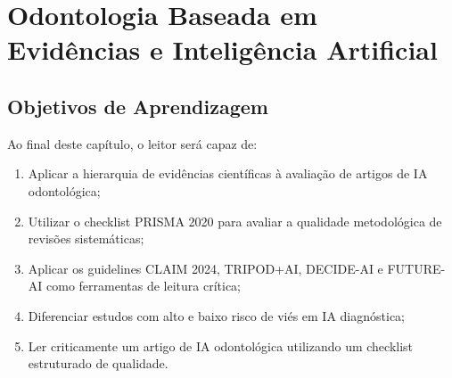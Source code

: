 
\chapter{Odontologia Baseada em Evidências e Inteligência Artificial}
\label{cap:evidencia-revisoes}

\nivelbasico

\section{Objetivos de Aprendizagem}

Ao final deste capítulo, o leitor será capaz de:
\begin{enumerate}
    \item Aplicar a hierarquia de evidências científicas à avaliação de artigos de IA odontológica;
    \item Utilizar o checklist PRISMA 2020 para avaliar a qualidade metodológica de revisões sistemáticas;
    \item Aplicar os guidelines CLAIM 2024, TRIPOD+AI, DECIDE-AI e FUTURE-AI como ferramentas de leitura crítica;
    \item Diferenciar estudos com alto e baixo risco de viés em IA diagnóstica;
    \item Ler criticamente um artigo de IA odontológica utilizando um checklist estruturado de qualidade.
\end{enumerate}


